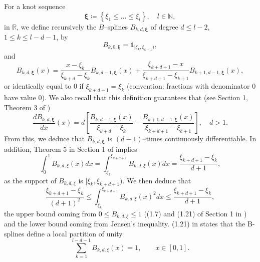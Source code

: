 \documentclass[preprint]{imsart}
\newtheorem{lemma}[theorem]{Lemma}
\numberwithin{equation}{section}
\begin{document}
For a knot sequence \[\mathbf{\xi}\coloneqq {\left\{\xi_1\leq\dots\leq\xi_l\right\}},\quad l\in\mathbb{N},\]
in $\mathbb{R}$, we define recursively the $B$--splines $B_{k,d,\mathbf{\xi}}$ of degree $d\leq l-2$, $1\leq k\leq l-d-1$, by
\[B_{k,0,\mathbf{\xi}}=\mathds{1}_{[\xi_k, \xi_{k+1})},\]
and
\[B_{k,d,\mathbf{\xi}}(x)=\frac{x-\xi_k}{\xi_{k+d}-\xi_k}B_{k,d-1,\mathbf{\xi}}(x)+\frac{\xi_{k+d+1}-x}{\xi_{k+d+1}-\xi_{k+1}}B_{k+1,d-1,\mathbf{\xi}}(x),\]
or identically equal to $0$ if $\xi_{k+d+1}=\xi_k$ (convention: fractions with denominator $0$ have value $0$).
We also recall that this definition guarantees that (see Section 1, Theorem 3 of \cite{LycheSpline})
\begin{equation}\label{eq: derivatives} \frac{dB_{k,d,\mathbf{\xi}}}{dx}(x) = d \left[\frac{B_{k,d-1,\mathbf{\xi}}(x)}{\xi_{k+d}-\xi_k}-\frac{B_{k+1,d-1,\mathbf{\xi}}(x)}{\xi_{k+d+1}-\xi_{k+1}}\right],\quad d> 1.\end{equation}
From this, we deduce that $B_{k,d,\mathbf{\xi}}$ is $(d-1)$--times continuously differentiable. In addition, Theorem 5 in Section 1 of \cite{LycheSpline} implies
\begin{equation}\label{eq: integral b-splines}\int_{0}^1 B_{k,d,\xi}(x)dx = \int_{\xi_k}^{\xi_{k+d+1}} B_{k,d,\xi}(x)dx = \frac{\xi_{k+d+1}-\xi_k}{d+1},\end{equation} as the support of $B_{k,d,\xi}$ is $[\xi_k,\xi_{k+d+1})$. We then deduce that
\begin{equation}\label{eq: norm splines}\frac{\xi_{k+d+1}-\xi_k}{(d+1)^2}\leq\int_{\xi_k}^{\xi_{k+d+1}} B_{k,d,\xi}(x)^2dx\leq \frac{\xi_{k+d+1}-\xi_k}{d+1},\end{equation}
the upper bound coming from $0\leq B_{k,d,\xi}\leq 1$ ((1.7) and (1.21) of Section 1 in \cite{LycheSpline}) and the lower bound coming from Jensen's inequality. (1.21) in \cite{LycheSpline} states that the B-splines define a local partition of unity
\begin{equation}\label{eq: partition of unity}\sum_{k=1}^{l-d-1} B_{k,d,\xi}(x) = 1,\qquad x\in[0,1].\end{equation}
\end{document}
